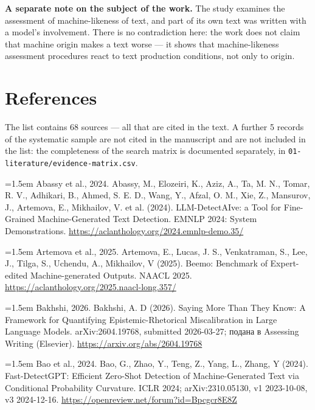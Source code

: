 \documentclass[11pt,a4paper]{article}
\renewcommand{\_}{\textunderscore\allowbreak}
\begin{document}
\textbf{A separate note on the subject of the work.} The study examines the assessment of
machine-likeness of text, and part of its own text was written with a model's
involvement. There is no contradiction here: the work does not claim that machine
origin makes a text worse — it shows that machine-likeness assessment procedures
react to text production conditions, not only to origin.

\section{References}

The list contains 68 sources — all that are cited in the text. A further 5 records of the systematic sample are not cited in the manuscript and are not included in the list: the completeness of the search matrix is documented separately, in \texttt{01-\allowbreak{}literature/evidence-\allowbreak{}matrix.csv}.

\noindent\hangindent=1.5em Abassy et al., 2024. Abassy, M., Elozeiri, K., Aziz, A., Ta, M. N., Tomar, R. V., Adhikari, B., Ahmed, S. E. D., Wang, Y., Afzal, O. M., Xie, Z., Mansurov, J., Artemova, E., Mikhailov, V. et al. (2024). LLM-DetectAIve: a Tool for Fine-Grained Machine-Generated Text Detection. EMNLP 2024: System Demonstrations. \url{https://aclanthology.org/2024.emnlp-demo.35/}\par\smallskip

\noindent\hangindent=1.5em Artemova et al., 2025. Artemova, E., Lucas, J. S., Venkatraman, S., Lee, J., Tilga, S., Uchendu, A., Mikhailov, V (2025). Beemo: Benchmark of Expert-edited Machine-generated Outputs. NAACL 2025. \url{https://aclanthology.org/2025.naacl-long.357/}\par\smallskip

\noindent\hangindent=1.5em Bakhshi, 2026. Bakhshi, A. D (2026). Saying More Than They Know: A Framework for Quantifying Epistemic-Rhetorical Miscalibration in Large Language Models. arXiv:2604.19768, submitted 2026-03-27; \foreignlanguage{russian}{подана в} Assessing Writing (Elsevier). \url{https://arxiv.org/abs/2604.19768}\par\smallskip

\noindent\hangindent=1.5em Bao et al., 2024. Bao, G., Zhao, Y., Teng, Z., Yang, L., Zhang, Y (2024). Fast-DetectGPT: Efficient Zero-Shot Detection of Machine-Generated Text via Conditional Probability Curvature. ICLR 2024; arXiv:2310.05130, v1 2023-10-08, v3 2024-12-16. \url{https://openreview.net/forum?id=Bpcgcr8E8Z}\par\smallskip
\end{document}
